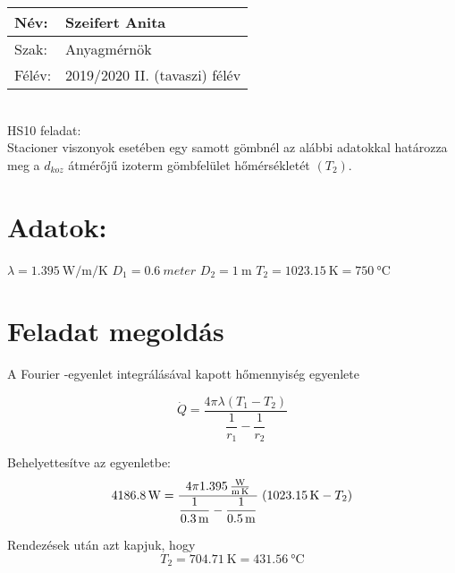 \documentclass[12pt, a4paper, onecolumn]{article}
\begin{document}
\begin{tabular}{ | p{1.5cm} | p{10cm} | } 
	\hline
	Név: &Szeifert Anita\\ 
	\hline
	Szak: & Anyagmérnök \\ 
	\hline
	Félév: & 2019/2020 II. (tavaszi) félév \\ 
\hline
\end{tabular}
\vspace{5mm}
\\HS10 feladat:\\
Stacioner viszonyok esetében egy samott gömbnél az alábbi adatokkal határozza meg a $d_{koz}$ átmérőjű izoterm gömbfelület hőmérsékletét $(T_2)$.
\section*{ {Adatok:}}

$\lambda=\SI[per-mode=fraction]{1,395}{\watt\per\meter\per\kelvin}$ $D_1 =\SI{0,6}{meter}$ $D_2 =\SI{1}{\meter}$ $T_2=\SI{1023,15}{\kelvin}=\SI{750}{\degreeCelsius}$


\vspace{1mm}
\section {Feladat megoldás}

A Fourier -egyenlet integrálásával kapott hőmennyiség egyenlete

\begin{equation}
	\dot{Q}=\dfrac{4\pi \lambda(T_1-T_2)}{\dfrac{1}{r_1}-\dfrac{1}{r_2}}
\end{equation}

\vspace{10mm}
Behelyettesítve az egyenletbe:
\begin{equation}
\SI{4186,8}{\watt}=\dfrac{4\pi\SI[per-mode=fraction]{1,395}{\watt\per\meter\per\kelvin}}
{\dfrac{1}{\SI{0.3}{\meter}}-\dfrac{1}{\SI{0,5}{\meter}}}
\hspace{1mm} (\SI{1023,15}{\kelvin}-T_2)
\end{equation}

Rendezések után azt kapjuk, hogy 
\begin{equation*}
    T_2=\SI{704,71}{\kelvin}=\SI{431,56}{\degreeCelsius}
\end{equation*}
   
\end{document}
